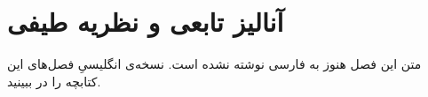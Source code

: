 \chapter{آنالیز تابعی و نظریه طیفی}
\label{ch:12-functional-analysis-and-spectral-theory-fa-01}

متن این فصل هنوز به فارسی نوشته نشده است. نسخه‌ی انگلیسیِ فصل‌های این کتابچه را در  ببینید.
